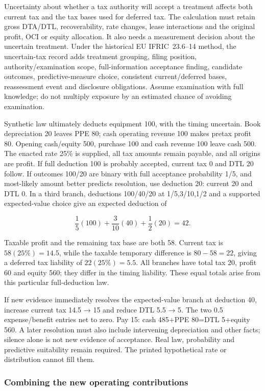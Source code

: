 Uncertainty about whether a tax authority will accept a treatment affects both current tax and the tax bases used for deferred tax. The calculation must retain gross DTA/DTL, recoverability, rate changes, lease interactions and the original profit, OCI or equity allocation. It also needs a measurement decision about the uncertain treatment. Under the historical EU IFRIC~23.6--14 \citep[IFRIC~23.6--14,A1--A5]{eu20231803} method, the uncertain-tax record adds treatment grouping, filing position, authority/examination scope, full-information acceptance finding, candidate outcomes, predictive-measure choice, consistent current/deferred bases, reassessment event and disclosure obligations. Assume examination with full knowledge; do not multiply exposure by an estimated chance of avoiding examination.

Synthetic law ultimately deducts equipment 100, with the timing uncertain. Book depreciation 20 leaves PPE 80; cash operating revenue 100 makes pretax profit 80. Opening cash/equity 500, purchase 100 and cash revenue 100 leave cash 500. The enacted rate 25\% is supplied, all tax amounts remain payable, and all origins are profit. If full deduction 100 is probably accepted, current tax 0 and DTL 20 follow. If outcomes 100/20 are binary with full acceptance probability 1/5, and most-likely amount better predicts resolution, use deduction 20: current 20 and DTL 0. In a third branch, deductions 100/40/20 at 1/5,3/10,1/2 and a supported expected-value choice give an expected deduction of

\[\frac15(100)+\frac3{10}(40)+\frac12(20)=42.\]

Taxable profit and the remaining tax base are both 58. Current tax is \(58(25\%)=14.5\), while the taxable temporary difference is \(80-58=22\), giving a deferred tax liability of \(22(25\%)=5.5\). All branches have total tax 20, profit 60 and equity 560; they differ in the timing liability. These equal totals arise from this particular full-deduction law.

If new evidence immediately resolves the expected-value branch at deduction 40, increase current tax 14.5 → 15 and reduce DTL 5.5 → 5. The two 0.5 expense/benefit entries net to zero. Pay 15: cash 485+PPE 80=DTL 5+equity 560. A later resolution must also include intervening depreciation and other facts; silence alone is not new evidence of acceptance. Real law, probability and predictive suitability remain required. The printed hypothetical rate or distribution cannot fill them.

\hypertarget{combining-the-new-operating-contributions}{%
\subsubsection{Combining the new operating contributions}\label{combining-the-new-operating-contributions}}

